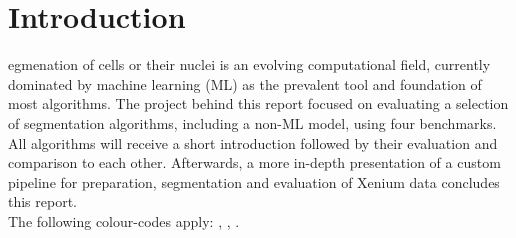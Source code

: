 \section*{Introduction}
egmenation of cells or their nuclei is an evolving computational field, currently dominated by machine learning (ML) as the prevalent tool and foundation of most algorithms. The project behind this report focused on evaluating a selection of segmentation algorithms, including a non-ML model, using four benchmarks. All algorithms will receive a short introduction followed by their evaluation and comparison to each other. Afterwards, a more in-depth presentation of a custom pipeline for preparation, segmentation and evaluation of Xenium data concludes this report.\\
The following colour-codes apply: , , .
%
% 
